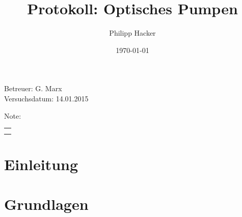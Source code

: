 \documentclass[numbers=noenddot,12pt,a4paper]{scrartcl}
\title{Protokoll: Optisches Pumpen} %
\author{Philipp Hacker} %
\date{\today}
\begin{document}
\maketitle
\begin{center}
Betreuer: G. Marx\\ %
Versuchsdatum: 14.01.2015\\ %
\begin{table}[h]
\centering
Note: %
\begin{tabularx}{1.5cm}{|X|}
\hline \\ \\
\hline
\end{tabularx}
\end{table}
\end{center}
\vspace*{\fill}
\tableofcontents
\vfill
\newpage
\section{Einleitung}
\section{Grundlagen}
\end{document}
